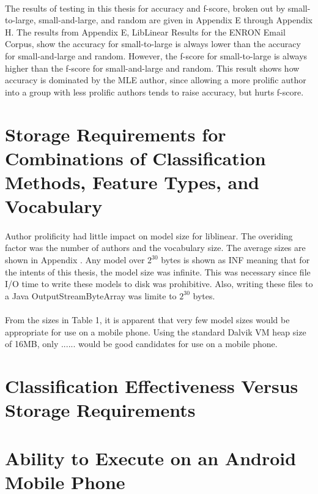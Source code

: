 	\paragraph*{} The results of testing in this thesis for accuracy and f-score, broken out by small-to-large, small-and-large, and random are given in Appendix E through Appendix H.  The results from Appendix E, LibLinear Results for the ENRON Email Corpus, show the accuracy for small-to-large is always lower than the accuracy for small-and-large and random.  However, the f-score for small-to-large is always higher than the f-score for small-and-large and random.  This result shows how accuracy is dominated by the MLE author, since allowing a more prolific author into a group with less prolific authors tends to raise accuracy, but hurts f-score. %

\section{Storage Requirements for Combinations of Classification Methods, Feature Types, and Vocabulary}
	\paragraph*{} Author prolificity had little impact on model size for liblinear.  The overiding factor was the number of authors and the vocabulary size.  The average sizes are shown in Appendix .  Any model over $2^30$ bytes is shown as INF meaning that for the intents of this thesis, the model size was infinite.  This was necessary since file I/O time to write these models to disk was prohibitive.  Also, writing these files to a Java OutputStreamByteArray was limite to $2^30$ bytes.
	
	
	
	\paragraph*{}  From the sizes in Table 1, it is apparent that very few model sizes would be appropriate for use on a mobile phone.  Using the standard Dalvik VM heap size of 16MB, only ...... would be good candidates for use on a mobile phone.

\section{Classification Effectiveness Versus Storage Requirements}


\section{Ability to Execute on an Android Mobile Phone}
